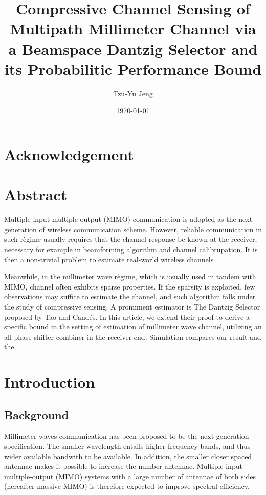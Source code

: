 \documentclass[12pt]{article}
\author{Tzu-Yu Jeng}
\date{\today}
\title{Compressive Channel Sensing of Multipath Millimeter Channel via a Beamspace Dantzig Selector and its Probabilitic Performance Bound}
\begin{document}
\maketitle

\section{Acknowledgement}


\section{Abstract}

Multiple-input-multiple-output (MIMO) communication is adopted as the next generation of wireless communication scheme.
However, reliable communication in such r\`egime usually requires that the channel response be known at the receiver, necessary for example in beamforming algorithm and channel calibrupation.
It is then a non-trivial problem to estimate real-world wireless channels 

Meanwhile, in the millimeter wave r\`egime, which is usually used in tandem with MIMO, channel often exhibits sparse properties.
If the sparsity is exploited, few observations may suffice to estimate the channel, and such algorithm falls under the study of compressive sensing.
A promiment estimator is The Dantzig Selector proposed by Tao and Cand\'es.
In this article, we extend their proof to derive a specific bound in the setting of estimation of millimeter wave channel, utilizing an all-phase-shifter combiner in the receiver end.
Simulation compares our result and the 



\section{Introduction}

\subsection{Background}

Millimeter waves communication has been proposed to be the next-generation specification.
The smaller wavelength entails higher frequency bands, and thus wider available bandwith to be available.
In addition, the smaller closer spaced antennae makes it possible to increase the number antennae.
Multiple-input multiple-output (MIMO) systems with a large number of antennae of both sides (hereafter massive MIMO) is therefore expected to improve spectral efficiency.
\end{document}
